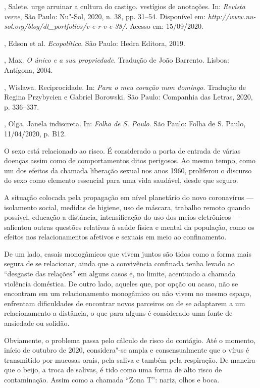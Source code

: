\begin{bibliohedra}
, Salete. urge arruinar a cultura do castigo. vestígios de
anotações. In: \emph{Revista verve}, São Paulo: Nu"-Sol, 2020, n. 38, pp.
31--54. Disponível em:
\emph{http://www.nu-sol.org/blog/dt\_portfolios/v-e-r-v-e-38/}. Acesso em:
15/09/2020.

, Edson et al. \emph{Ecopolítica}. São Paulo: Hedra Editora,
2019.

, Max. \emph{O único e a sua propriedade}. Tradução de João
Barrento. Lisboa: Antígona, 2004.

, Wislawa. Reciprocidade. In: \emph{Para o meu coração num
domingo}. Tradução de Regina Przybycien e Gabriel Borowski. São Paulo:
Companhia das Letras, 2020, p. 336--337.

, Olga. Janela indiscreta. In: \emph{Folha de S. Paulo}. São
Paulo: Folha de S. Paulo, 11/04/2020, p. B12.
\end{bibliohedra}


\noindent{}O sexo está relacionado ao risco. É considerado a porta de entrada de
várias doenças assim como de comportamentos ditos perigosos. Ao mesmo
tempo, como um dos efeitos da chamada liberação sexual nos anos 1960,
proliferou o discurso do sexo como elemento essencial para uma vida
saudável, desde que seguro.

A situação colocada pela propagação em nível planetário do novo
coronavírus --- isolamento social, medidas de higiene, uso de máscara,
trabalho remoto quando possível, educação a distância, intensificação do
uso dos meios eletrônicos --- salientou outras questões relativas à
saúde física e mental da população, como os efeitos nos relacionamentos
afetivos e sexuais em meio ao confinamento.

De um lado, casais monogâmicos que vivem juntos são tidos como a forma
mais segura de se relacionar, ainda que a convivência confinada tenha
levado ao ``desgaste das relações'' em alguns casos e, no limite,
acentuado a chamada violência doméstica. De outro lado, aqueles que, por
opção ou acaso, não se encontram em um relacionamento monogâmico ou não
vivem no mesmo espaço, enfrentam dificuldades de encontrar novos
parceiros ou de se adaptarem a um relacionamento a distância, o que para
alguns é considerado uma fonte de ansiedade ou solidão.

Obviamente, o problema passa pelo cálculo de risco do contágio. Até o
momento, início de outubro de 2020, considera"-se ampla e consensualmente
que o vírus é transmitido por mucosas orais, pela saliva e também pela
respiração. De maneira que o beijo, a troca de salivas, é tido como uma
forma de alto risco de contaminação. Assim como a chamada ``Zona T'':
nariz, olhos e boca.


